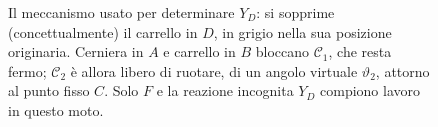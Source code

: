 \begin{figure}[htbp]
\caption{Il meccanismo usato per determinare $Y_D$: si sopprime
(concettualmente) il carrello in $D$, in grigio nella sua posizione
originaria. Cerniera in $A$ e carrello in $B$ bloccano
$\mathcal{C}_1$, che resta fermo; $\mathcal{C}_2$ è allora libero di
ruotare, di un angolo virtuale $\vartheta_2$, attorno al punto fisso
$C$. Solo $F$ e la reazione incognita $Y_D$ compiono lavoro in
questo moto.}
\label{fig:gerber_mecc_D}
\end{figure}
